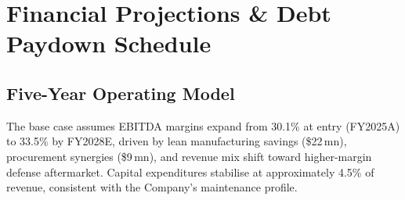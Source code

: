 
\section{Financial Projections \& Debt Paydown Schedule}

\subsection{Five-Year Operating Model}

The base case assumes EBITDA margins expand from 30.1\% at entry (FY2025A) to 33.5\% by FY2028E,
driven by lean manufacturing savings (\$22\,mn), procurement synergies (\$9\,mn), and revenue mix
shift toward higher-margin defense aftermarket. Capital expenditures stabilise at approximately
4.5\% of revenue, consistent with the Company's maintenance profile.

\vspace{6pt}

